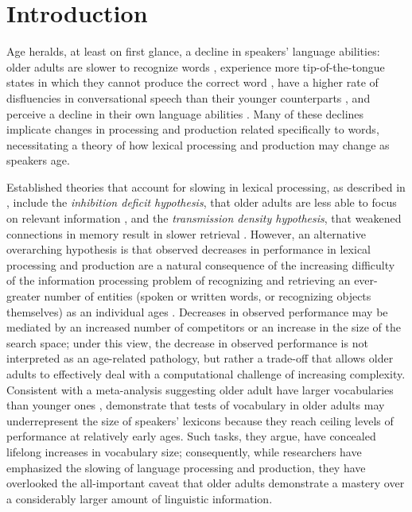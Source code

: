 \documentclass[10pt,letterpaper]{article}
\begin{document}
\section{Introduction}
Age heralds, at least on first glance, a decline in speakers' language abilities: older adults are slower to recognize words \citep{spielerBalota2000}, experience more tip-of-the-tongue states in which they cannot produce the correct word \citep{brownNix1996}, have a higher rate of disfluencies in conversational speech than their younger counterparts \citep{hortonEtAl2010}, and perceive a decline in their own language abilities \citep{ryanEtAl1992}. Many of these declines implicate changes in processing and production related specifically to words, necessitating a theory of how lexical processing and production may change as speakers age.

Established theories that account for slowing in lexical processing, as described in \citet{thorntonLight2006}, include the \textit{inhibition deficit hypothesis}, that  older adults are less able to focus on relevant information \citep{hasherEtAl1997}, and the \textit{transmission density hypothesis}, that weakened connections in memory result in slower retrieval \citep{burkeEtAl1991}. However, an alternative overarching hypothesis is that observed decreases in performance in lexical processing and production are a natural consequence of the increasing difficulty of the information processing problem of recognizing and retrieving an ever-greater number of entities (spoken or written words, or recognizing objects themselves) as an individual ages \citep{ramscarEtAl2014}. Decreases in observed performance may be mediated by an increased number of competitors or an increase in the size of the search space; under this view, the decrease in observed performance is not interpreted as an age-related pathology, but rather a trade-off that allows older adults to effectively deal with a computational challenge of increasing complexity. Consistent with a meta-analysis suggesting older adult have larger vocabularies than younger ones \citep{verhaeghen2003}, \citeauthor{ramscarEtAl2014} demonstrate that tests of vocabulary in older adults may underrepresent the size of speakers' lexicons because they reach ceiling levels of performance at relatively early ages. Such tasks, they argue, have concealed lifelong increases in vocabulary size; consequently, while researchers have emphasized the slowing of language processing and production, they have overlooked the all-important caveat that older adults demonstrate a mastery over a considerably larger amount of linguistic information.
\end{document}
